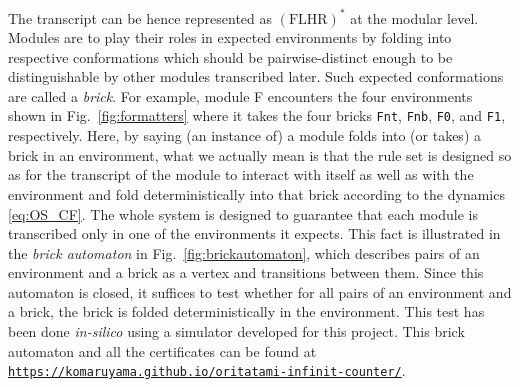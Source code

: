 \documentclass[twocolumn]{svjour3}
\begin{document}
\noindent
The transcript can be hence represented as $(\mathrm{FLHR})^*$ at the modular level. Modules are to play their roles in expected environments by folding into respective conformations which should be pairwise-distinct enough to be distinguishable by other modules transcribed later.
Such expected conformations are called a \textit{brick}.
For example, module F encounters the four environments shown in Fig.~\ref{fig:formatters} where it takes the four bricks \texttt{Fnt}, \texttt{Fnb}, \texttt{F0}, and \texttt{F1}, respectively.
Here, by saying (an instance of) a module folds into (or takes) a brick in an environment, what we actually mean is that the rule set is designed so as for the transcript of the module to interact with itself as well as with the environment and fold deterministically into that brick according to the dynamics  \eqref{eq:OS_CF}.
The whole system is designed to guarantee that each module is transcribed only in one of the environments it expects.
This fact is illustrated in the \textit{brick automaton} in Fig.~\ref{fig:brickautomaton}, which describes pairs of an environment and a brick as a vertex and transitions between them.
Since this automaton is closed, it suffices to test whether for all pairs of an environment and a brick, the brick is folded deterministically in the environment.
This test has been done \textit{in-silico} using a simulator developed for this project.
This brick automaton and all the certificates can be found at \href{https://komaruyama.github.io/oritatami-infinit-counter/}{\footnotesize \texttt{https://komaruyama.github.io/oritatami-infinit-counter/}}.
\end{document}
